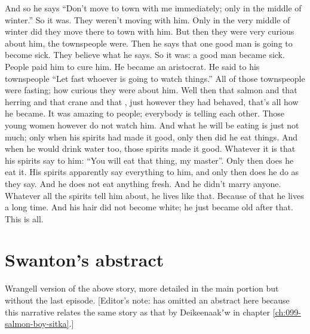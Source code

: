 \begin{pairs}
\begin{Rightside}
\pstart
{}And so he says
\qqk{}“Don’t move to town with me immediately; only in the middle of winter.”
So it was.
They weren’t moving with him.
Only in the very middle of winter did they move there to town with him.
But then they were very curious about him, the townspeople were.
Then he says that one good man is going to become sick.
They believe what he says.
So it was:
a good man became sick.
People paid him to cure him.
He became an aristocrat.
He said to his townspeople
\qqk{}“Let fast whoever is going to watch things.”
All of those townspeople were fasting;
how curious they were about him.
Well then that salmon and that herring and that crane and that , 
just however they had behaved, that’s all how he became.
It was amazing to people;
everybody is telling each other.
Those young women however do not watch him.
And what he will be eating is just not much;
only when his spirits had made it good, only then did he eat things.
And when he would drink water too, those spirits made it good.
Whatever it is that his spirits say to him:
\qqk{}“You will eat that thing, my master”.
Only then does he eat it.
His spirits apparently say everything to him, and only then does he do as they say.
And he does not eat anything fresh.
And he didn’t marry anyone.
Whatever all the spirits tell him about, he lives like that.
Because of that he lives a long time.
And his hair did not become white;
he just became old after that.
This is all.
\pend
\endnumbering
\end{Rightside}
\end{pairs}
\Columns

\vspace{1\baselineskip}

\section{Swanton’s abstract}\label{sec:100-swanton-abstract}

Wrangell version of the above story, more detailed in the main portion but without the last episode. [Editor’s note: \citeauthor{swanton:1909} has omitted an abstract here because this narrative relates the same story as that by Deikeenaakʼw in chapter \ref{ch:099-salmon-boy-sitka}.]

